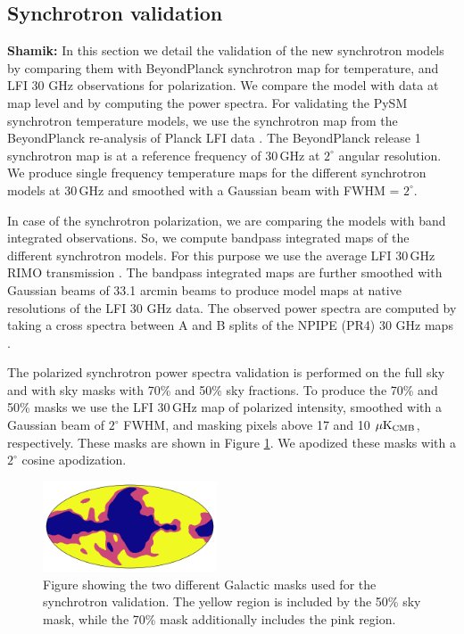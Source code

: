 \documentclass[twocolumn]{aastex631}
\begin{document}
\subsection{Synchrotron validation} \label{sec:sync_validation}
\textbf{Shamik:} In this section we detail the validation of the new synchrotron models by comparing them with BeyondPlanck synchrotron map for temperature, and LFI 30 GHz observations for polarization. We compare the model with data at map level and by computing the power spectra. For validating the PySM synchrotron temperature models, we use the synchrotron map from the BeyondPlanck re-analysis of Planck LFI data \citep{2022arXiv220108188A}. The BeyondPlanck release 1 synchrotron map is at a reference frequency of 30\,GHz at $2^\circ$ angular resolution. We produce single frequency temperature maps for the different synchrotron models at 30\,GHz and smoothed with a Gaussian beam with FWHM = $2^\circ$.

In case of the synchrotron polarization, we are comparing the models with band integrated observations. So, we compute bandpass integrated maps of the different synchrotron models. For this purpose we use the average LFI 30\,GHz RIMO transmission \citep{planck2014-a03}. The bandpass integrated maps are further smoothed with Gaussian beams of 33.1 arcmin beams to produce model maps at native resolutions of the LFI 30 GHz data. The observed power spectra are computed by taking a cross spectra between A and B splits of the NPIPE (PR4) 30 GHz maps \citep{planck2020-LVII}.

The polarized synchrotron power spectra validation is performed on the full sky and with sky masks with 70\% and 50\% sky fractions. To produce the 70\% and 50\% masks we use the LFI 30\,GHz map of polarized intensity, smoothed with a Gaussian beam of $2^\circ$ FWHM, and masking pixels above 17 and 10 $\mu{\rm K}_{\rm CMB}$, respectively. These masks are shown in Figure \ref{fig:sync_masks}. We apodized these masks with a $2^\circ$ cosine apodization.
\begin{figure}
    \centering
    \includegraphics[width=0.46\textwidth]{figures/sync_galactic_mask.png}
    \caption{Figure showing the two different Galactic masks used for the synchrotron validation. The yellow region is included by the 50\% sky mask, while the 70\% mask additionally includes the pink region.}
    \label{fig:sync_masks}
\end{figure}
\end{document}
